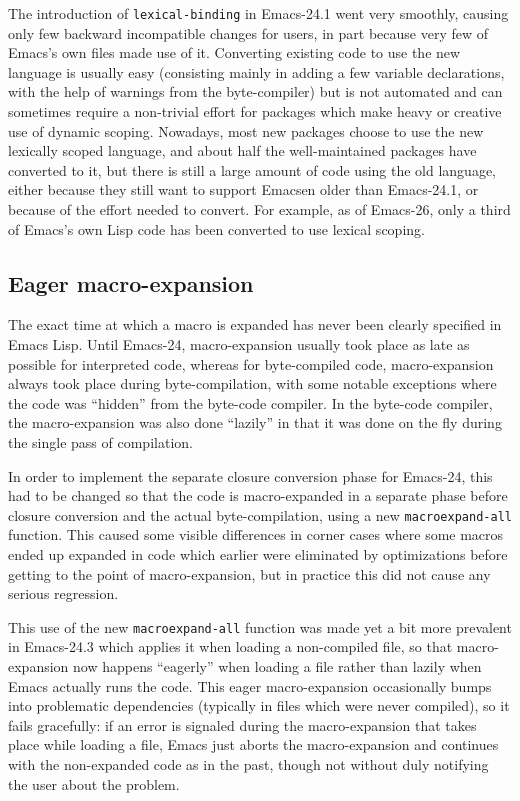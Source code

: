 \documentclass[format=acmsmall, review]{acmart}
\newcommand \Elisp {Emacs Lisp}
\begin{document}
The introduction of \texttt{lexical-binding} in Emacs-24.1 went very smoothly,
causing only few backward incompatible changes for users, in part because
very few of Emacs's own files made use of it.  Converting existing code to
use the new language is usually easy (consisting mainly in adding a few
variable declarations, with the help of warnings from the byte-compiler) but
is not automated and can sometimes require a non-trivial effort for packages
which make heavy or creative use of dynamic scoping.  Nowadays, most new
packages choose to use the new lexically scoped language, and about half the
well-maintained packages have converted to it, but there is still a large
amount of code using the old language, either because they still want to
support Emacsen older than Emacs-24.1, or because of the effort needed to
convert.  For example, as of Emacs-26, only a third of Emacs's own Lisp code
has been converted to use lexical scoping.


\subsection{Eager macro-expansion} %
\label{sec:eager-macro-expansion}

The exact time at which a macro is expanded has never been clearly specified
in \Elisp{}.  Until Emacs-24, macro-expansion usually took place as late as
possible for interpreted code, whereas for byte-compiled code,
macro-expansion always took place during byte-compilation, with some notable
exceptions where the code was ``hidden'' from the byte-code compiler.  In the
byte-code compiler, the macro-expansion was also done ``lazily'' in that it was
done on the fly during the single pass of compilation.

In order to implement the separate closure conversion phase for Emacs-24,
this had to be changed so that the code is macro-expanded in a separate
phase before closure conversion and the actual byte-compilation, using a new
\texttt{macroexpand-all} function.
This caused some visible differences in corner cases where some macros ended
up expanded in code which earlier were eliminated by optimizations before
getting to the point of macro-expansion, but in practice this did not cause
any serious regression.

This use of the new \texttt{macroexpand-all} function was made yet a bit
more prevalent in Emacs-24.3 which applies it when loading
a non-compiled file, so that macro-expansion now happens ``eagerly'' when
loading a file rather than lazily when Emacs actually runs the code.  This eager
macro-expansion occasionally bumps into problematic dependencies (typically
in files which were never compiled), so it fails gracefully: if an
error is signaled during the macro-expansion that takes place while loading
a file, Emacs just aborts the macro-expansion and continues with the non-expanded
code as in the past, though not without duly notifying the user about
the problem.
\end{document}
